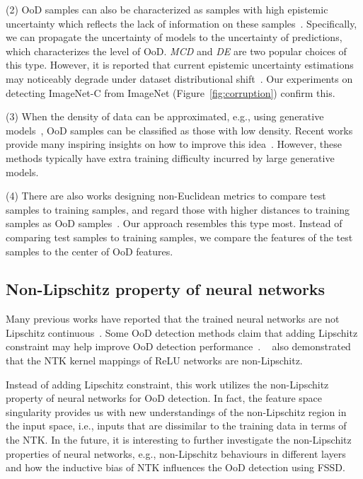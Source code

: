 \documentclass[letterpaper]{article}
\begin{document}
(2) OoD samples can also be characterized as samples with high epistemic uncertainty which reflects the lack of information on these samples~\cite{deepensemble, mcdropout, WeightUncertainty}.
Specifically, we can propagate the uncertainty of models to the uncertainty of predictions, which characterizes the level of OoD.
\textit{MCD} and \textit{DE} are two popular choices of this type.
However, it is reported that current epistemic uncertainty estimations may noticeably degrade under dataset distributional shift~\cite{Ovadia2019CanYT}.
Our experiments on detecting ImageNet-C from ImageNet (Figure~\ref{fig:corruption}) confirm this.

(3) When the density of data can be approximated, e.g., using generative models~\cite{kingma2018glow, pixelcnn++}, OoD samples can be classified as those with low density.
Recent works provide many inspiring insights on how to improve this idea~\cite{ren2019likelihood, typicality, inputcomplexity}. 
However, these methods typically have extra training difficulty incurred by large generative models.


(4) There are also works designing non-Euclidean metrics to compare test samples to training samples, and regard those with higher distances to training samples as OoD samples~\cite{mahalanobis,duq, kamoi2020mahalanobis, sngp}.
Our approach resembles this type most. Instead of comparing test samples to training samples, we compare the features of the test samples to the center of OoD features.



\subsection{Non-Lipschitz property of neural networks}
Many previous works have reported that the trained neural networks are not Lipschitz continuous~\cite{behrmann_invertible_2019, duq, sngp}. Some OoD detection methods claim that adding Lipschitz constraint may help improve OoD detection performance~\cite{duq, sngp}.
~\cite{bietti_inductive_2019} also demonstrated that the NTK kernel mappings of ReLU networks are  non-Lipschitz. 

Instead of adding Lipschitz constraint, this work utilizes the non-Lipschitz property of neural networks for OoD detection. In fact, the feature space singularity provides us with new understandings of the non-Lipschitz region in the input space, i.e., inputs that are dissimilar to the training data in terms of the NTK.
In the future, it is interesting to further investigate the non-Lipschitz properties of neural networks, e.g., non-Lipschitz behaviours in different layers and how the inductive bias of NTK influences the OoD detection using FSSD.
\end{document}
